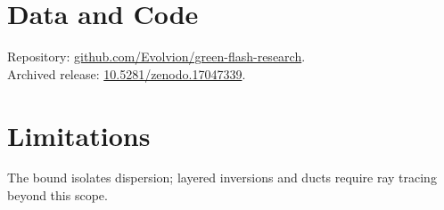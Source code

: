 \documentclass[11pt]{article}
\begin{document}
\section*{Data and Code}
Repository: \href{https://github.com/Evolvion/green-flash-research}{github.com/Evolvion/green-flash-research}.\\
Archived release: \href{https://doi.org/10.5281/zenodo.17047339}{10.5281/zenodo.17047339}.

\section{Limitations}
The bound isolates dispersion; layered inversions and ducts require ray tracing beyond this scope.



\end{document}
